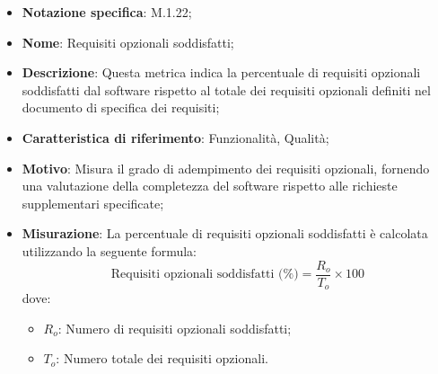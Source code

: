 \begin{itemize}
    \item \textbf{Notazione specifica}: M.1.22;
    \item \textbf{Nome}: Requisiti opzionali soddisfatti;
    \item \textbf{Descrizione}: Questa metrica indica la percentuale di requisiti opzionali soddisfatti dal software rispetto al totale dei requisiti opzionali definiti nel documento di specifica dei requisiti;
    \item \textbf{Caratteristica di riferimento}: Funzionalità, Qualità;
    \item \textbf{Motivo}: Misura il grado di adempimento dei requisiti opzionali, fornendo una valutazione della completezza del software rispetto alle richieste supplementari specificate;
    \item \textbf{Misurazione}: La percentuale di requisiti opzionali soddisfatti è calcolata utilizzando la seguente formula:
    \[
    \text{Requisiti opzionali soddisfatti (\%)} = \frac{R_{o}}{T_{o}} \times 100
    \]
    dove:
    \begin{itemize}
        \item $R_{o}$: Numero di requisiti opzionali soddisfatti;
        \item $T_{o}$: Numero totale dei requisiti opzionali.
    \end{itemize}
\end{itemize}

